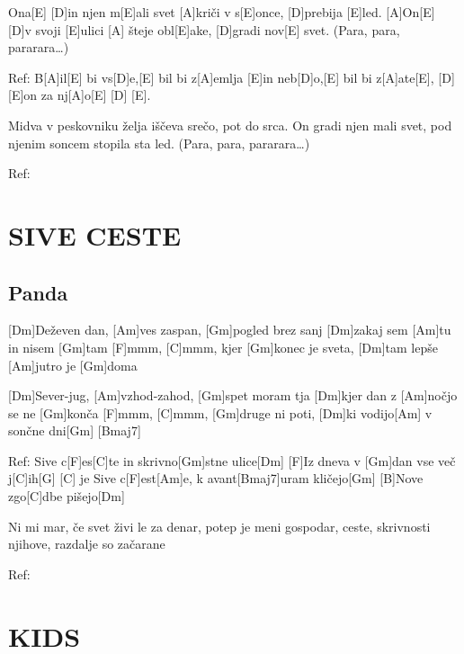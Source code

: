 \documentclass{article}
\begin{document}
\begin{multicols}{2}
\begin{guitar}
	[A]Ona[E] [D]in njen m[E]ali svet
	[A]kriči v s[E]once, [D]prebija [E]led.
	[A]On[E] [D]v svoji [E]ulici
	[A] šteje obl[E]ake, [D]gradi nov[E] svet.
	(Para, para, pararara…)
	\linebreak

	Ref:
	B[A]il[E] bi vs[D]e,[E] bil bi z[A]emlja [E]in neb[D]o,[E]
	bil bi z[A]ate[E], [D] [E]on za nj[A]o[E] [D] [E].
	\linebreak

	Midva v peskovniku želja
	iščeva srečo, pot do srca.
	On gradi njen mali svet,
	pod njenim soncem stopila sta led.
	(Para, para, pararara…)
	\linebreak

	Ref:

\end{guitar}


\section*{SIVE CESTE}
%
\subsection*{Panda}
\begin{guitar}

	[Dm]Deževen dan, [Am]ves zaspan, [Gm]pogled brez sanj
	[Dm]zakaj sem [Am]tu in nisem [Gm]tam
	[F]mmm, [C]mmm, kjer [Gm]konec je sveta,
	[Dm]tam lepše [Am]jutro je [Gm]doma
	\linebreak

	[Dm]Sever-jug, [Am]vzhod-zahod, [Gm]spet moram tja
	[Dm]kjer dan z [Am]nočjo se ne [Gm]konča
	[F]mmm, [C]mmm, [Gm]druge ni poti,
	[Dm]ki vodijo[Am] v sončne dni[Gm] [Bmaj7]
	\linebreak

	Ref:
	Sive c[F]es[C]te in skrivno[Gm]stne ulice[Dm]
	[F]Iz dneva v [Gm]dan vse več j[C]ih[G] [C] je
	Sive c[F]est[Am]e, k avant[Bmaj7]uram kličejo[Gm]
	[B]Nove zgo[C]dbe pišejo[Dm]
	\linebreak

	Ni mi mar, če svet živi le za denar,
	potep je meni gospodar,
	ceste, skrivnosti njihove,
	razdalje so začarane
	\linebreak

	Ref:

\end{guitar}

\section*{KIDS}
%

\end{multicols}
\end{document}
